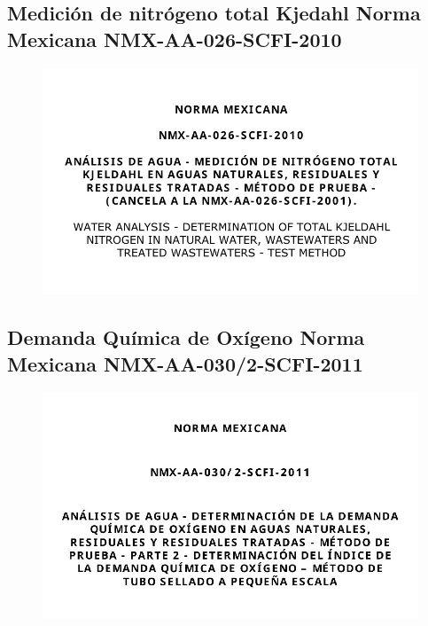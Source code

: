 \subsection*{Medición de nitrógeno total Kjedahl Norma Mexicana NMX-AA-026-SCFI-2010}
\begin{center} 
	\begin{figure}[h]
		\includegraphics*[scale=0.825]{../Images/NMX-AA-026-SCFI-2010.jpg}
	\end{figure}
\end{center}
\clearpage

\subsection*{Demanda Química de Oxígeno Norma Mexicana NMX-AA-030/2-SCFI-2011}
\begin{center} 
	\begin{figure}[h]
		\includegraphics*[scale=0.825]{../Images/NMX-AA-030-2-SCFI-2011.jpg}
	\end{figure}
\end{center}
\clearpage

